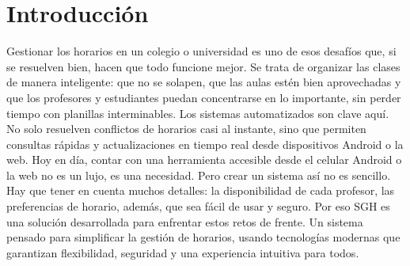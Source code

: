 \section{Introducción}
Gestionar los horarios en un colegio o universidad es uno de esos desafíos que, si se resuelven bien, hacen que todo funcione mejor. Se trata de organizar las clases de manera inteligente: que no se solapen, que las aulas estén bien aprovechadas y que los profesores y estudiantes puedan concentrarse en lo importante, sin perder tiempo con planillas interminables. Los sistemas automatizados son clave aquí. No solo resuelven conflictos de horarios casi al instante, sino que permiten consultas rápidas y actualizaciones en tiempo real desde dispositivos Android o la web. Hoy en día, contar con una herramienta accesible desde el celular Android o la web no es un lujo, es una necesidad. Pero crear un sistema así no es sencillo. Hay que tener en cuenta muchos detalles: la disponibilidad de cada profesor, las preferencias de horario, además, que sea fácil de usar y seguro. Por eso SGH es una solución desarrollada para enfrentar estos retos de frente. Un sistema pensado para simplificar la gestión de horarios, usando tecnologías modernas que garantizan flexibilidad, seguridad y una experiencia intuitiva para todos.